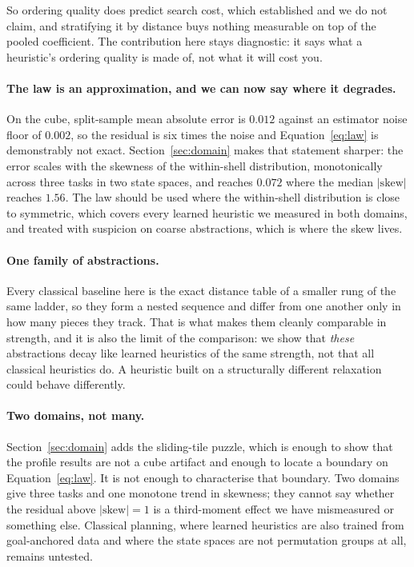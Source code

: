 \documentclass{article}
\begin{document}
So ordering quality does predict search cost, which \citet{wilt2016} established
and we do not claim, and stratifying it by distance buys nothing measurable on
top of the pooled coefficient. The contribution here stays diagnostic: it says
what a heuristic's ordering quality is made of, not what it will cost you.

\paragraph{The law is an approximation, and we can now say where it degrades.}
On the cube, split-sample mean absolute error is $0.012$ against an estimator
noise floor of $0.002$, so the residual is six times the noise and
Equation~\ref{eq:law} is demonstrably not exact. Section~\ref{sec:domain} makes
that statement sharper: the error scales with the skewness of the within-shell
distribution, monotonically across three tasks in two state spaces, and reaches
$0.072$ where the median $|\mathrm{skew}|$ reaches $1.56$. The law should be used
where the within-shell distribution is close to symmetric, which covers every
learned heuristic we measured in both domains, and treated with suspicion on
coarse abstractions, which is where the skew lives.

\paragraph{One family of abstractions.} Every classical baseline here is the exact
distance table of a smaller rung of the same ladder, so they form a nested
sequence and differ from one another only in how many pieces they track. That is
what makes them cleanly comparable in strength, and it is also the limit of the
comparison: we show that \emph{these} abstractions decay like learned heuristics
of the same strength, not that all classical heuristics do. A heuristic built on
a structurally different relaxation could behave differently.

\paragraph{Two domains, not many.} Section~\ref{sec:domain} adds the sliding-tile
puzzle, which is enough to show that the profile results are not a cube artifact
and enough to locate a boundary on Equation~\ref{eq:law}. It is not enough to
characterise that boundary. Two domains give three tasks and one monotone trend in
skewness; they cannot say whether the residual above $|\mathrm{skew}| = 1$ is a
third-moment effect we have mismeasured or something else. Classical planning,
where learned heuristics are also trained from goal-anchored data and where the
state spaces are not permutation groups at all, remains untested.
\end{document}
